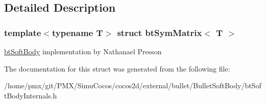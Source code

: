 \subsection{Detailed Description}
\subsubsection*{template$<$typename T$>$\newline
struct bt\+Sym\+Matrix$<$ T $>$}

\hyperlink{classbtSoftBody}{bt\+Soft\+Body} implementation by Nathanael Presson 

The documentation for this struct was generated from the following file\+:\begin{DoxyCompactItemize}
\item 
/home/pmx/git/\+P\+M\+X/\+Simu\+Cocos/cocos2d/external/bullet/\+Bullet\+Soft\+Body/bt\+Soft\+Body\+Internals.\+h\end{DoxyCompactItemize}
